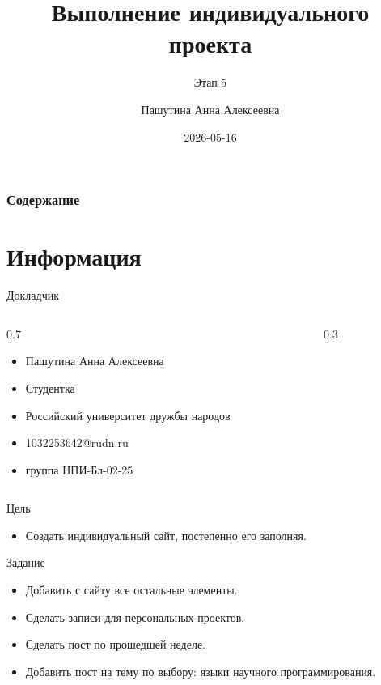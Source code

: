 \documentclass[
  ignorenonframetext,
  aspectratio=169,
  russian,
]{beamer}
\title{Выполнение индивидуального проекта}
\subtitle{Этап 5}
\author{Пашутина Анна Алексеевна}
\date{2026-05-16}
\providecommand{\tightlist}{%
  \setlength{\itemsep}{0pt}\setlength{\parskip}{0pt}}\usepackage{longtable,booktabs,array}
\renewcommand*\contentsname{Содержание}
\newcommand\contentsname{Содержание}
\begin{document}
\frame{\titlepage}

\renewcommand*\contentsname{Содержание}
\begin{frame}[allowframebreaks]
  \frametitle{Содержание}
  \setcounter{tocdepth}{1}
  \tableofcontents
\end{frame}

\section{Информация}\label{ux438ux43dux444ux43eux440ux43cux430ux446ux438ux44f}

\begin{frame}{Докладчик}
\label{ux434ux43eux43aux43bux430ux434ux447ux438ux43a}
\begin{columns}[c]
\begin{column}{0.7\linewidth}
\begin{itemize}[<+->]
\tightlist
\item
  Пашутина Анна Алексеевна
\item
  Студентка
\item
  Российский университет дружбы народов
\item
  1032253642@rudn.ru
\item
  группа НПИ-Бл-02-25
\end{itemize}
\end{column}

\begin{column}{0.3\linewidth}
\end{column}
\end{columns}
\end{frame}

\begin{frame}{Цель}
\label{ux446ux435ux43bux44c}
\begin{itemize}[<+->]
\tightlist
\item
  Создать индивидуальный сайт, постепенно его заполняя.
\end{itemize}
\end{frame}

\begin{frame}{Задание}
\label{ux437ux430ux434ux430ux43dux438ux435}
\begin{itemize}[<+->]
\tightlist
\item
  Добавить с сайту все остальные элементы.
\item
  Сделать записи для персональных проектов.
\item
  Сделать пост по прошедшей неделе.
\item
  Добавить пост на тему по выбору: языки научного программирования.
\end{itemize}
\end{frame}
\end{document}
